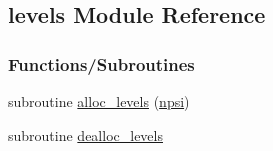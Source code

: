 \hypertarget{namespacelevels}{}\subsection{levels Module Reference}
\label{namespacelevels}
\subsubsection*{Functions/\+Subroutines}
\begin{DoxyCompactItemize}
\item 
subroutine \hyperlink{namespacelevels_ab6baa988e04debfb3d1dccc8918168e6}{alloc\+\_\+levels} (\hyperlink{namespacelevels_aa9870c52b50461dd864875bf5572da11}{npsi})
\item 
subroutine \hyperlink{namespacelevels_a9f2cce4a9f7a1adf27d37ad06fd21bb4}{dealloc\+\_\+levels}
\end{DoxyCompactItemize}
